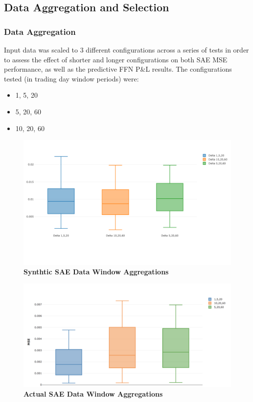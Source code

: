 \documentclass[a4paper,11pt,oneside]{article}
\theoremstyle{plain}
\theoremstyle{definition}
\begin{document}
\subsection{Data Aggregation and Selection}

\subsubsection{Data Aggregation}

Input data was scaled to 3 different configurations across a series of tests in order to assess the effect of shorter and longer configurations on both SAE MSE performance, as well as the predictive FFN P\&L results. The configurations tested (in trading day window periods) were:

\begin{itemize}
	\item 1, 5, 20
	\item 5, 20, 60
	\item 10, 20, 60
\end{itemize}

\begin{figure}[H]
		\centering 
		\includegraphics[scale=0.3]{images/iteration_four/it4_sae_deltas.png}
		\caption{\textbf{Synthtic SAE Data Window Aggregations} 
			\newline }
		\label{figure-results_sae_deltas_synth}
\end{figure}

\begin{figure}[H]
	\centering 
	\includegraphics[scale=0.3]{images/results/data/sae_mse_actual.png}
	\caption{\textbf{Actual SAE Data Window Aggregations} 
		\newline }
	\label{figure-results_sae_deltas_actual}
\end{figure}
\end{document}
